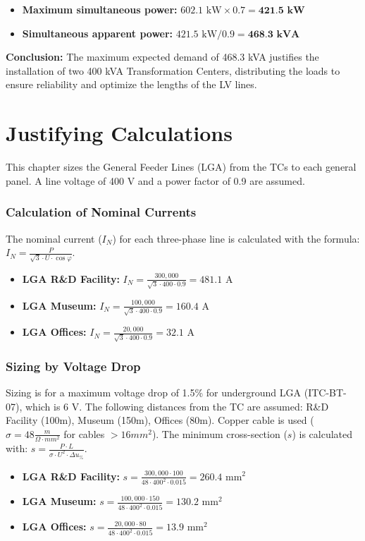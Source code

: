 \documentclass[12pt, a4paper]{report}
\begin{document}
\begin{itemize}
    \item \textbf{Maximum simultaneous power:} $602.1 \text{ kW} \times 0.7 = \textbf{421.5 kW}$
    \item \textbf{Simultaneous apparent power:} $421.5 \text{ kW} / 0.9 = \textbf{468.3 kVA}$
\end{itemize}

\textbf{Conclusion:} The maximum expected demand of 468.3 kVA justifies the installation of two 400 kVA Transformation Centers, distributing the loads to ensure reliability and optimize the lengths of the LV lines.

\chapter{Justifying Calculations}
\label{chap:calculos}
This chapter sizes the General Feeder Lines (LGA) from the TCs to each general panel. A line voltage of 400 V and a power factor of 0.9 are assumed.

\subsection{Calculation of Nominal Currents}
The nominal current ($I_N$) for each three-phase line is calculated with the formula: $I_N = \frac{P}{\sqrt{3} \cdot U \cdot \cos \varphi}$.
\begin{itemize}
    \item \textbf{LGA R\&D Facility:} $I_N = \frac{300,000}{\sqrt{3} \cdot 400 \cdot 0.9} = 481.1 \text{ A}$
    \item \textbf{LGA Museum:} $I_N = \frac{100,000}{\sqrt{3} \cdot 400 \cdot 0.9} = 160.4 \text{ A}$
    \item \textbf{LGA Offices:} $I_N = \frac{20,000}{\sqrt{3} \cdot 400 \cdot 0.9} = 32.1 \text{ A}$
\end{itemize}

\subsection{Sizing by Voltage Drop}
Sizing is for a maximum voltage drop of 1.5\% for underground LGA (ITC-BT-07), which is 6 V. The following distances from the TC are assumed: R\&D Facility (100m), Museum (150m), Offices (80m). Copper cable is used ($\sigma = 48 \frac{m}{\Omega \cdot mm^2}$ for cables $>16mm^2$).
The minimum cross-section ($s$) is calculated with: $s = \frac{P \cdot L}{\sigma \cdot U^2 \cdot \Delta u_{\%}}$.
\begin{itemize}
    \item \textbf{LGA R\&D Facility:} $s = \frac{300,000 \cdot 100}{48 \cdot 400^2 \cdot 0.015} = 260.4 \text{ mm}^2$
    \item \textbf{LGA Museum:} $s = \frac{100,000 \cdot 150}{48 \cdot 400^2 \cdot 0.015} = 130.2 \text{ mm}^2$
    \item \textbf{LGA Offices:} $s = \frac{20,000 \cdot 80}{48 \cdot 400^2 \cdot 0.015} = 13.9 \text{ mm}^2$
\end{itemize}
\end{document}
